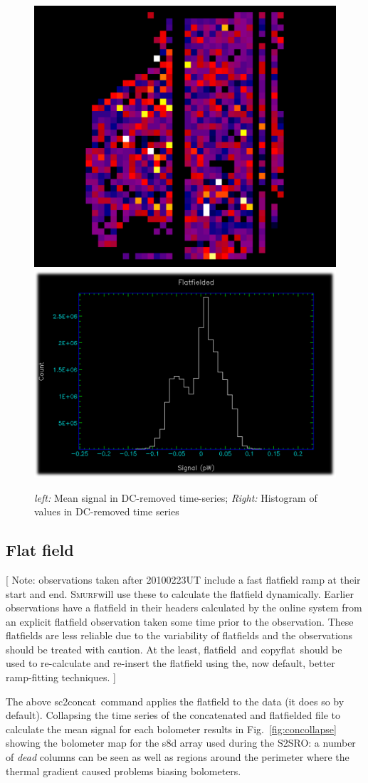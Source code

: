 \documentclass[twoside,11pt]{article}
\newcommand{\xref}[3]{#1}
\newcommand{\xlabel}[1]{}
\renewcommand{\_}{\texttt{\symbol{95}}}
\newcommand{\smurf}{\xref{\textsc{Smurf}}{sun258}{}}
\newcommand{\task}[1]{\textsf{#1}}
\newcommand{\copyflat}{\xref{\task{copyflat}}{sun258}{COPYFLAT}}
\newcommand{\concat}{\xref{\task{sc2concat}}{sun258}{SC2CONCAT}}
\newcommand{\flatfield}{\xref{\task{flatfield}}{sun258}{FLATFIELD}}
\begin{document}
\begin{figure}
\begin{center}
\includegraphics[width=0.45\linewidth]{sc19_conbsl_collapse}
\hspace{0.03\linewidth}
\includegraphics[width=0.45\linewidth]{sc19_bsl_histogram}
\caption{{\sl left:} Mean signal in DC-removed time-series; 
         {\sl Right:} Histogram of values in DC-removed time series }
\label{fig:conbslcollapse}
\end{center}
\end{figure}

\subsection{\xlabel{flatfield2}Flat field}
\label{sec:flatfield2}

[ Note: observations taken after 20100223UT include a fast flatfield
ramp at their start and end. \smurf will use these to calculate the
flatfield dynamically. Earlier observations have a flatfield in their
headers calculated by the online system from an explicit flatfield
observation taken some time prior to the observation. These flatfields
are less reliable due to the variability of flatfields and the
observations should be treated with caution. At the least, \flatfield\ 
and \copyflat\  should be used to re-calculate and re-insert the
flatfield using the, now default, better ramp-fitting techniques. ]

The above \concat\  command applies the flatfield to the data (it
does so by default). Collapsing the time series of the concatenated
and flatfielded file to calculate the mean signal for each bolometer
results in Fig.~\ref{fig:concollapse} showing the bolometer map for
the s8d array used during the S2SRO: a number of {\sl dead} columns
can be seen as well as regions around the perimeter where the thermal
gradient caused problems biasing bolometers.
\end{document}
